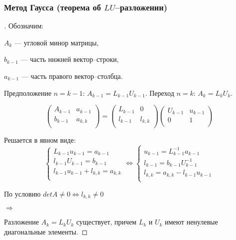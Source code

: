 \documentclass[10pt]{beamer}
\begin{document}
\begin{frame}[fragile]
\frametitle{Метод Гаусса (теорема об $LU$--разложении)}

\begin{proof}[]
Обозначим: 

$A_k$ --- угловой минор матрицы,

$b_{k-1}$ --- часть нижней вектор--строки, 

$a_{k-1}$ --- часть правого вектор--столбца.

Предположение $n = k - 1$: $A_{k-1} = L_{k-1} U_{k-1}$. Переход $n = k$: $A_{k} = L_{k} U_{k}$. 



$$
\begin{pmatrix}
A_{k-1} & a_{k-1} \\
b_{k-1} & a_{k,k} \\
\end{pmatrix}
=
\begin{pmatrix}
L_{k-1} & 0 \\
l_{k-1} & l_{k,k} \\
\end{pmatrix}
\begin{pmatrix}
U_{k-1} & u_{k-1} \\
0 & 1 \\
\end{pmatrix}
$$

Решается в явном виде:
$$
\begin{cases}
L_{k - 1} u_{k-1} = a_{k - 1}\\
l_{k - 1} U_{k-1} = b_{k - 1}\\
l_{k - 1} u_{k-1} + l_{k, k} = a_{k, k}\\
\end{cases}
\Leftrightarrow
\begin{cases}
u_{k-1} = L_{k - 1}^{-1} a_{k - 1}\\
l_{k - 1} = b_{k - 1} U_{k-1}^{-1}\\
l_{k, k} = a_{k, k} - l_{k - 1} u_{k-1}\\
\end{cases}
$$

По условию $det A \neq 0 \Leftrightarrow l_{k, k} \neq 0$ 

$\Rightarrow$ 

Разложение $A_k = L_k U_k$ существует, причем $L_{k}$ и $U_{k}$ имеют ненулевые диагональные элементы.
\end{proof}

\end{frame}
\end{document}
